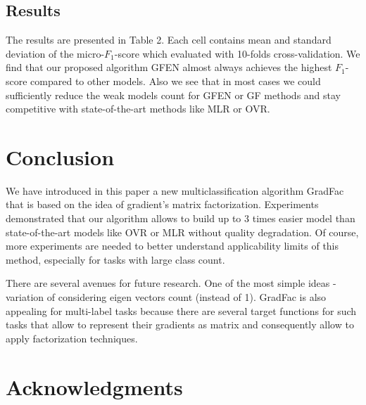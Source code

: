 \documentclass{article}
\begin{document}
\subsection{Results}
The results are presented in Table 2. Each cell contains mean and standard deviation of the micro-$F_1$-score which evaluated with 10-folds cross-validation. We find that our proposed algorithm GFEN almost always achieves the highest $F_1$-score compared to other models. Also we see that in most cases we could sufficiently reduce the weak models count for GFEN or GF methods and stay competitive with state-of-the-art methods like MLR or OVR.


\section{Conclusion}
We have introduced in this paper a new multiclassification algorithm GradFac that is based on the idea of gradient's matrix factorization. Experiments demonstrated that our algorithm allows to build up to 3 times easier model than state-of-the-art models like OVR or MLR without quality degradation. Of course, more experiments are needed to better understand applicability limits of this method, especially for tasks with large class count.

There are several avenues for future research. One of the most simple ideas - variation of considering eigen vectors count (instead of 1). GradFac is also appealing for multi-label tasks because there are several target functions for such tasks \cite{Tsoumakas07multi-labelclassification} that allow to represent their gradients as matrix and consequently allow to apply factorization techniques.

\section*{Acknowledgments} 



\nocite{Hastie_theelements}
\nocite{GLM}
\nocite{Friedman98additivelogistic}
\nocite{Friedman00greedyfunction}
\nocite{Zhao_sparseoutput}
\nocite{Allwein00reducingmulticlass}
\nocite{Crammer00onthe}
\nocite{Rifkin04indefense}
\nocite{Lee01algorithmsfor}
\nocite{Koren09matrixfactorization}
\nocite{Hu08collaborativefiltering}
\nocite{Gulin_winningthe}
\nocite{Eckart1936}
\nocite{elasticnet05}
\nocite{Efron1992bootstrap}
\nocite{uciRepo}



\end{document}
